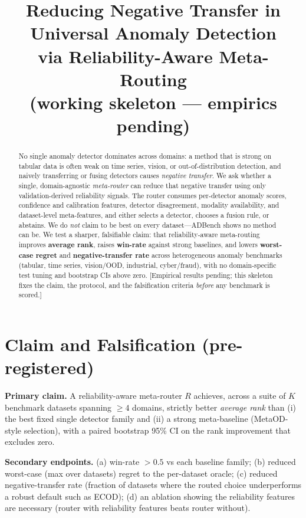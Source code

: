 \documentclass[11pt]{article}
\title{\textbf{Reducing Negative Transfer in Universal Anomaly Detection\\
via Reliability-Aware Meta-Routing}\\[4pt]\large (working skeleton --- empirics pending)}
\author{}\date{}
\begin{document}
\maketitle

\begin{abstract}
No single anomaly detector dominates across domains: a method that is strong on
tabular data is often weak on time series, vision, or out-of-distribution
detection, and naively transferring or fusing detectors causes \emph{negative
transfer}. We ask whether a single, domain-agnostic \emph{meta-router} can reduce
that negative transfer using only validation-derived reliability signals. The
router consumes per-detector anomaly scores, confidence and calibration features,
detector disagreement, modality availability, and dataset-level meta-features, and
either selects a detector, chooses a fusion rule, or abstains. We do \emph{not}
claim to be best on every dataset---ADBench shows no method can be. We test a
sharper, falsifiable claim: that reliability-aware meta-routing improves
\textbf{average rank}, raises \textbf{win-rate} against strong baselines, and
lowers \textbf{worst-case regret} and \textbf{negative-transfer rate} across
heterogeneous anomaly benchmarks (tabular, time series, vision/OOD, industrial,
cyber/fraud), with no domain-specific test tuning and bootstrap CIs above zero.
[Empirical results pending; this skeleton fixes the claim, the protocol, and the
falsification criteria \emph{before} any benchmark is scored.]
\end{abstract}

\section{Claim and Falsification (pre-registered)}
\textbf{Primary claim.} A reliability-aware meta-router $R$ achieves, across a
suite of $K$ benchmark datasets spanning $\ge 4$ domains, strictly better
\emph{average rank} than (i) the best fixed single detector family and (ii) a
strong meta-baseline (MetaOD-style selection), with a paired bootstrap 95\% CI on
the rank improvement that excludes zero.

\noindent\textbf{Secondary endpoints.} (a) win-rate $> 0.5$ vs each baseline
family; (b) reduced worst-case (max over datasets) regret to the per-dataset
oracle; (c) reduced negative-transfer rate (fraction of datasets where the routed
choice underperforms a robust default such as ECOD); (d) an ablation showing the
reliability features are necessary (router with reliability features beats router
without).
\end{document}
